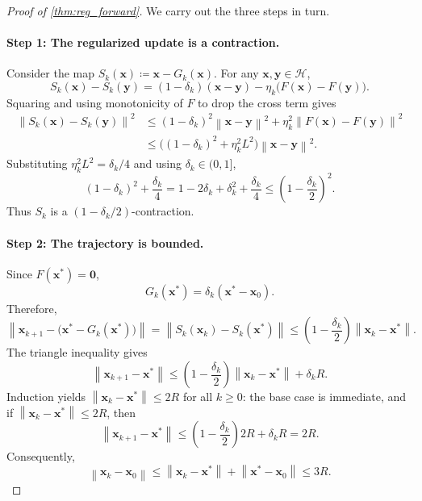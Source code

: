 \documentclass[letterpaper,11pt]{article}
\newcommand{\norm}[1]{\left\| #1 \right\|}
\newcommand{\vect}[1]{\mathbf{#1}}
\begin{document}
\begin{proof}[Proof of \cref{thm:reg_forward}]
We carry out the three steps in turn.

\paragraph{Step 1: The regularized update is a contraction.}
Consider the map \(S_k(\vect{x})\coloneqq\vect{x}-G_k(\vect{x})\). For any
\(\vect{x},\vect{y}\in\mathcal H\),
\[
    S_k(\vect{x})-S_k(\vect{y})
    =
    (1-\delta_k)(\vect{x}-\vect{y})
    -\eta_k\bigl(F(\vect{x})-F(\vect{y})\bigr).
\]
Squaring and using monotonicity of \(F\) to drop the cross term gives
\begin{align*}
    \norm{S_k(\vect{x})-S_k(\vect{y})}^2
    &\le
    (1-\delta_k)^2\norm{\vect{x}-\vect{y}}^2
    +\eta_k^2\norm{F(\vect{x})-F(\vect{y})}^2 \\
    &\le
    \bigl((1-\delta_k)^2+\eta_k^2L^2\bigr)
    \norm{\vect{x}-\vect{y}}^2.
\end{align*}
Substituting \(\eta_k^2L^2=\delta_k/4\) and using
\(\delta_k\in(0,1]\),
\[
    (1-\delta_k)^2+\frac{\delta_k}{4}
    =
    1-2\delta_k+\delta_k^2+\frac{\delta_k}{4}
    \le
    \left(1-\frac{\delta_k}{2}\right)^2.
\]
Thus \(S_k\) is a \((1-\delta_k/2)\)-contraction.

\paragraph{Step 2: The trajectory is bounded.}
Since \(F(\vect{x}^*)=\vect{0}\),
\[
    G_k(\vect{x}^*)=\delta_k(\vect{x}^*-\vect{x}_0).
\]
Therefore,
\[
    \norm{\vect{x}_{k+1}-\bigl(\vect{x}^*-G_k(\vect{x}^*)\bigr)}
    =
    \norm{S_k(\vect{x}_k)-S_k(\vect{x}^*)}
    \le
    \left(1-\frac{\delta_k}{2}\right)\norm{\vect{x}_k-\vect{x}^*}.
\]
The triangle inequality gives
\[
    \norm{\vect{x}_{k+1}-\vect{x}^*}
    \le
    \left(1-\frac{\delta_k}{2}\right)\norm{\vect{x}_k-\vect{x}^*}
    +\delta_k R.
\]
Induction yields \(\norm{\vect{x}_k-\vect{x}^*}\le2R\) for all \(k\ge0\): the
base case is immediate, and if \(\norm{\vect{x}_k-\vect{x}^*}\le2R\), then
\[
    \norm{\vect{x}_{k+1}-\vect{x}^*}
    \le
    \left(1-\frac{\delta_k}{2}\right)2R+\delta_kR
    =
    2R.
\]
Consequently,
\[
    \norm{\vect{x}_k-\vect{x}_0}
    \le
    \norm{\vect{x}_k-\vect{x}^*}+\norm{\vect{x}^*-\vect{x}_0}
    \le
    3R.
\]


\end{proof}
\end{document}

